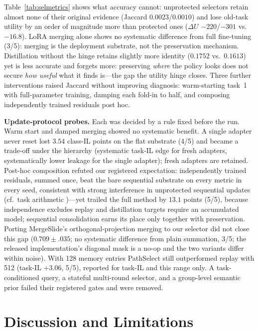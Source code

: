 \documentclass{article}
\begin{document}
Table~\ref{tab:selmetrics} shows what accuracy cannot: unprotected selectors retain almost none of their original evidence (Jaccard $0.0023$/$0.0010$) and lose old-task utility by an order of magnitude more than protected ones ($\Delta U$ $-220$/$-301$ vs.\ $-16.8$).
LoRA merging alone shows no systematic difference from full fine-tuning (3/5): merging is the deployment substrate, not the preservation mechanism.
Distillation without the hinge retains slightly more identity ($0.1752$ vs.\ $0.1613$) yet is less accurate and forgets more: preserving \emph{where} the policy looks does not secure \emph{how useful} what it finds is---the gap the utility hinge closes.
Three further interventions raised Jaccard without improving diagnosis: warm-starting task~1 with full-parameter training, damping each fold-in to half, and composing independently trained residuals post hoc.

\textbf{Update-protocol probes.}
Each was decided by a rule fixed before the run.
Warm start and damped merging showed no systematic benefit.
A single adapter never reset lost $3.54$ class-IL points on the flat substrate (4/5) and became a trade-off under the hierarchy (systematic task-IL edge for fresh adapters, systematically lower leakage for the single adapter); fresh adapters are retained.
Post-hoc composition refuted our registered expectation: independently trained residuals, summed once, beat the bare sequential substrate on every metric in every seed, consistent with strong interference in unprotected sequential updates (cf.\ task arithmetic \cite{ilharco2023task})---yet trailed the full method by $13.1$ points (5/5), because independence excludes replay and distillation targets require an accumulated model; sequential consolidation earns its place only together with preservation.
Porting MergeSlide's orthogonal-projection merging \cite{bui2026mergeslide} to our selector did not close this gap ($0.709{\pm}.035$; no systematic difference from plain summation, 3/5; the released implementation's diagonal mask is a no-op and the two variants differ within noise).
With 128 memory entries PathSelect still outperformed replay with 512 (task-IL $+3.06$, 5/5), reported for task-IL and this range only.
A task-conditioned query, a stateful multi-round selector, and a group-level semantic prior failed their registered gates and were removed.



\section{Discussion and Limitations}
\label{sec:discussion}
\end{document}
